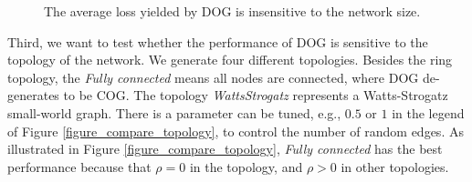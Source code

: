 \documentclass{article}
\begin{document}
\begin{figure}[!h]
\caption{The average loss yielded by DOG is insensitive to the network size.}
\label{figure_compare_network_size}
\end{figure}


Third, we want to test whether the performance of DOG is sensitive to the topology of the network. We generate four different topologies. Besides the ring topology, the \textit{Fully connected} means all nodes are connected, where DOG de-generates to be COG. The topology  \textit{WattsStrogatz} represents a Watts-Strogatz small-world graph. There is a parameter can be tuned, e.g., $0.5$ or $1$ in the legend of Figure \ref{figure_compare_topology}, to control the number of random edges.  As illustrated in Figure \ref{figure_compare_topology}, \textit{Fully connected} has the best performance because that $\rho = 0$ in the topology, and $\rho>0$ in other topologies.  
\end{document}
